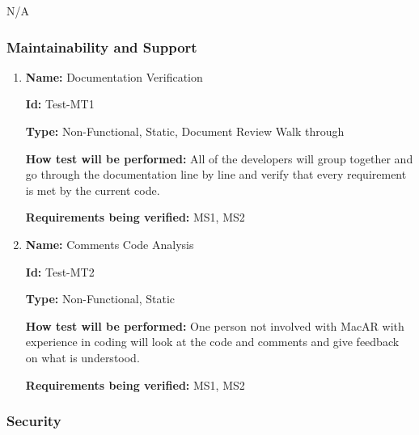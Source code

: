 \documentclass[12pt, titlepage]{article}
\begin{document}
N/A

\subsubsection{Maintainability and Support}

\begin{enumerate}

\item{\textbf{Name:} Documentation Verification} \label{itm:Test-MT1}

\textbf{Id:} Test-MT1

\textbf{Type:} Non-Functional, Static, Document Review Walk through
			
\textbf{How test will be performed:} All of the developers will group together and go through the documentation line by line and verify that every requirement is met by the current code.

\textbf{Requirements being verified:} MS1, MS2

\item{\textbf{Name:} Comments Code Analysis} \label{itm:Test-MT2}

\textbf{Id:} Test-MT2

\textbf{Type:} Non-Functional, Static
					
\textbf{How test will be performed:} One person not involved with MacAR with experience in coding will look at the code and comments and give feedback on what is understood.

\textbf{Requirements being verified:} MS1, MS2

\end{enumerate}

\subsubsection{Security}
\end{document}
